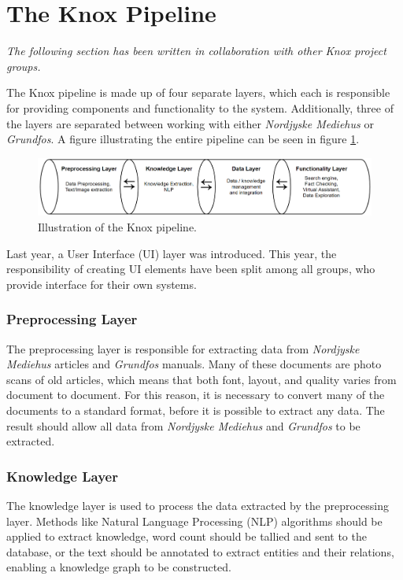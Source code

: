 \section{The Knox Pipeline}\label{the_knox_pipeline}
\textit{The following section has been written in collaboration with other Knox project groups.}


The Knox pipeline is made up of four separate layers, which each is responsible for providing components and functionality to the system.
 Additionally, three of the layers are separated between working with either \textit{Nordjyske Mediehus} or \textit{Grundfos}.
  A figure illustrating the entire pipeline can be seen in figure \ref{fig:pipeline}.

\begin{figure}[h]
    \centering
    \includegraphics[width=1\textwidth]{Images/Pipeline.PNG}
    \caption{Illustration of the Knox pipeline\label{fig:pipeline}.}
\end{figure}

Last year, a User Interface (UI) layer was introduced. This year, the responsibility of creating UI elements have been split among all groups, who provide interface for their own systems.

\subsubsection{Preprocessing Layer}
The preprocessing layer is responsible for extracting data from \textit{Nordjyske Mediehus} articles and \textit{Grundfos} manuals. Many of these documents are photo scans of old articles, which means that both font, layout, and quality varies from document to document. For this reason, it is necessary to convert many of the documents to a standard format, before it is possible to extract any data. The result should allow all data from \textit{Nordjyske Mediehus} and \textit{Grundfos} to be extracted. 

\subsubsection{Knowledge Layer}
The knowledge layer is used to process the data extracted by the preprocessing layer. Methods like Natural Language Processing (NLP) algorithms should be applied to extract knowledge, word count should be tallied and sent to the database, or the text should be annotated to extract entities and their relations, enabling a knowledge graph to be constructed.

